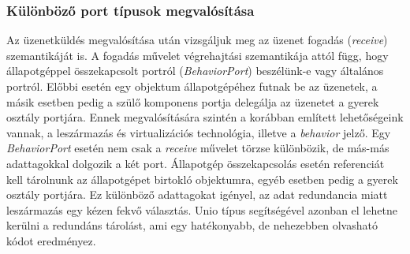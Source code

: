\documentclass[a4paper,12pt]{report}
\begin{document}
\subsubsection{Különböző port típusok megvalósítása}
Az üzenetküldés megvalósítása után vizsgáljuk meg az üzenet fogadás (\textit{receive}) szemantikáját is. A fogadás művelet végrehajtási szemantikája attól függ, hogy állapotgéppel összekapcsolt portról (\textit{BehaviorPort}) beszélünk-e vagy általános portról. Előbbi esetén egy objektum állapotgépéhez futnak be az üzenetek, a másik esetben pedig a szülő komponens portja delegálja az üzenetet a gyerek osztály portjára. Ennek megvalósítására szintén a korábban említett lehetőségeink vannak, a leszármazás és virtualizációs technológia, illetve a \textit{behavior} jelző. Egy \textit{BehaviorPort} esetén nem csak a \textit{receive} művelet törzse különbözik, de más-más adattagokkal dolgozik a két port. Állapotgép összekapcsolás esetén referenciát kell tárolnunk az állapotgépet birtokló objektumra, egyéb esetben pedig a gyerek osztály portjára. Ez különböző adattagokat igényel, az adat redundancia miatt leszármazás egy kézen fekvő választás. Unio típus segítségével azonban el lehetne kerülni a redundáns tárolást, ami egy hatékonyabb, de nehezebben olvasható kódot eredményez.
\end{document}
